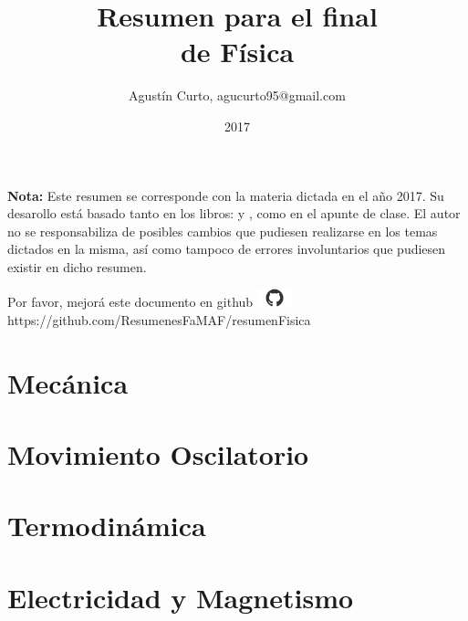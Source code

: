 \documentclass[12pt,a4paper]{article}
\author{Agustín Curto, agucurto95@gmail.com}
\title{Resumen para el final \\ de Física}
\date{2017}
\newcommand{\PN}{\par\noindent}
\begin{document}
	\clearpage\maketitle
	\thispagestyle{empty}
	\tableofcontents

	\vspace{5cm}
	\PN \textbf{Nota:} Este resumen se corresponde con la materia dictada en el año 2017. Su desarollo está basado tanto
	en los libros: \cite{1} y \cite{2}, como en el apunte de clase. El autor no se responsabiliza de posibles cambios que
	pudiesen realizarse en los temas dictados en la misma, así como tampoco de errores involuntarios que pudiesen existir
	en dicho resumen.
	
	
	

	\vspace{\fill}
	\begin{center}
		Por favor, mejorá este documento en github
		\includegraphics[width=1cm]{graphics/github.png} \\
		https://github.com/ResumenesFaMAF/resumenFisica
	\end{center}

	\pagebreak

	\part{Mecánica}
		
		
		
		
		
		
		
		
		
		
		
		
		

	\part{Movimiento Oscilatorio}
		
		
		
		
		

	\part{Termodinámica}
		
		
		
		
		
		
		
		
		

	\part{Electricidad y Magnetismo}
		
		
		
		
		
		
\end{document}

